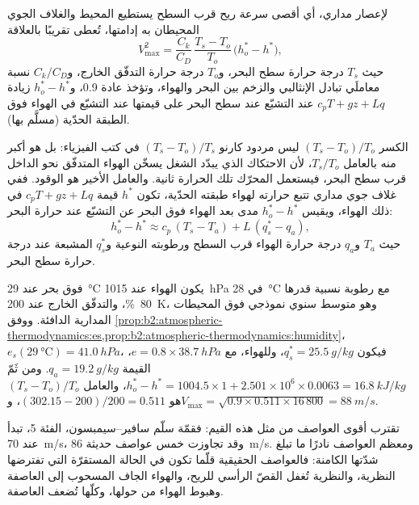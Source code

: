 \begin{proposition}\label{prop:b2:weather-systems:pi}
\emph{} لإعصار مداري، أي أقصى سرعة ريح قرب السطح يستطيع
المحيط والغلاف الجوي المحيطان به إدامتها، تُعطى تقريبًا بالعلاقة
\[
  V_{\max}^2 = \frac{C_k}{C_D}\,\frac{T_s - T_o}{T_o}\,\bigl(h_o^* - h^*\bigr),
\]
حيث $T_s$ درجة حرارة سطح البحر، و$T_o$ درجة حرارة التدفّق الخارج، و$C_k/C_D$
نسبة معاملَي تبادل الإنثالبي والزخم بين البحر والهواء،
وتؤخذ عادة 0.9، و$h_o^* - h^*$ زيادة $c_pT + gz + Lq$ عند التشبّع عند سطح
البحر على قيمتها عند التشبّع في الهواء فوق الطبقة الحدّية (مسلَّم بها).
\end{proposition}

الكسر $(T_s - T_o)/T_o$ ليس مردود كارنو $(T_s - T_o)/T_s$ في كتب
الفيزياء: بل هو أكبر منه بالعامل $T_s/T_o$، لأن الاحتكاك الذي يبدّد الشغل يسخّن
الهواء المتدفّق نحو الداخل قرب سطح البحر، فيستعمل المحرّك تلك الحرارة ثانية. والعامل الأخير
هو الوقود. ففي غلاف جوي مداري تتبع حرارته  لهواء
طبقته الحدّية، تكون $h^*$ قيمة $c_pT + gz + Lq$ في ذلك الهواء، ويقيس $h_o^* - h^*$
مدى بعد الهواء فوق البحر عن التشبّع عند حرارة البحر:
\[
  h_o^* - h^* \approx c_p\,(T_s - T_a) + L\,(q_s^* - q_a),
\]
حيث $T_a$ و$q_a$ درجة حرارة الهواء قرب السطح ورطوبته النوعية
و$q_s^*$  المشبعة عند درجة حرارة سطح البحر.

\begin{example}[شدّة كامنة]\label{ex:b2:weather-systems:pi}
فوق بحر عند \qty{29}{\celsius} يكون الهواء عند \qty{1015}{hPa} في \qty{28}{\celsius} مع
رطوبة نسبية قدرها \qty{80}{\percent}، والتدفّق الخارج عند \qty{200}{K}، وهو متوسط سنوي
نموذجي فوق المحيطات المدارية الدافئة. ووفق \cref{prop:b2:atmospheric-thermodynamics:es,prop:b2:atmospheric-thermodynamics:humidity}،
$e_s(\qty{29}{\celsius}) = \qty{41.0}{hPa}$، فيكون $q_s^* = \qty{25.5}{g/kg}$، وللهواء، مع
$e = 0.8 \times \qty{38.7}{hPa}$، القيمة $q_a = \qty{19.2}{g/kg}$. ومن ثَمّ $h_o^* - h^* = 1004.5 \times
1 + 2.501 \times 10^6 \times 0.0063 = \qty{16.8}{kJ/kg}$، والعامل $(T_s - T_o)/T_o$ هو
$(302.15 - 200)/200 = 0.511$، و$V_{\max} = \sqrt{0.9 \times 0.511 \times 16\,800} =
\qty{88}{m/s}$.
\end{example}

تقترب أقوى العواصف من مثل هذه القيم: فقمّة سلّم سافير--سيمبسون، الفئة
5، تبدأ عند \qty{70}{m/s}، وقد تجاوزت خمس عواصف حديثة \qty{86}{m/s}. ومعظم العواصف
نادرًا ما تبلغ شدّتها الكامنة: فالعواصف الحقيقية قلّما تكون في الحالة المستقرّة التي تفترضها
النظرية، والنظرية تُغفل القصّ الرأسي للريح، والهواء الجاف المسحوب إلى العاصفة
وهبوط الهواء من حولها، وكلّها تُضعف العاصفة.

